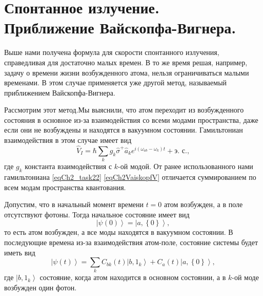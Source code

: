 \section{Спонтанное излучение. \\
  Приближение Вайскопфа-Вигнера.}
Выше нами получена формула для скорости спонтанного излучения,
справедливая для достаточно малых времен. В то же время решая,
например, задачу о времени жизни возбужденного атома, нельзя
ограничиваться малыми временами. В этом случае применяется уже другой
метод, называемый приближением Вайскопфа-Вигнера.

Рассмотрим этот метод.Мы выяснили, что атом переходит из возбужденного
состояния в основное из-за взаимодействия со всеми модами
пространства, даже если они не возбуждены и находятся в вакуумном
состоянии. Гамильтониан взаимодействия в этом случае имеет вид
\begin{equation}
\hat{V}_I = \hbar \sum_{k} g_k \hat{\sigma}^{+}\hat{a}_k e^{i\left(
\omega_{ab} - \omega_k
\right)t} + \mbox{э. с.},
\label{eqCh2VaiskopfV}
\end{equation}
где $g_k$ константа взаимодействия с $k$-ой модой. От ранее
использованного нами гамильтониана \eqref{eqCh2_task22}
\eqref{eqCh2VaiskopfV} отличается суммированием по всем модам
пространства квантования. 

Допустим, что в начальный момент времени $t=0$ атом возбужден, а в
поле отсутствуют фотоны. Тогда начальное состояние имеет вид
\begin{equation}
\left|\psi\left(0\right)\right> =
 \left|a, \left\{0\right\}\right>,
\nonumber
\end{equation}
то есть атом возбужден, а все моды находятся в вакуумном состоянии. В
последующие времена из-за взаимодействия атом-поле, состояние системы
будет иметь вид
\begin{equation}
\left|\psi\left(t\right)\right> =
\sum_{k} C_{bk}\left(t\right) \left|b, 1_k\right>
+
C_{a}\left(t\right) \left|a, \left\{0\right\}\right>,
\label{eqCh2Vaiskopf3}
\end{equation}
где $\left|b, 1_k\right>$ состояние, когда атом находится в основном
состоянии, а в $k$-ой моде возбужден один фотон. 

